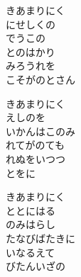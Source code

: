 \documentclass[10pt,b5j]{tarticle} %
\begin{document}
\vspace{1.5em} %
\newcommand{\linespace}{0.5em} %
\newcommand{\blocksize}{0.5\hsize} %
\begin{enumerate} %
    \begin{minipage}[c]{\blocksize}
    
        \vspace{\linespace}
        \item
        きあまりにく\\
        にせしくの\\
        でうこの\\
        とのはかり\\
        みろうれを\\
        こそがのとさん
        
        \vspace{\linespace}
        \item
        きあまりにく\\
        えしのを\\
        いかんはこのみ\\
        れてがのても\\
        れぬをいつつ\\
        とをに
        
        \vspace{\linespace}
        \item
        きあまりにく\\
        ととにはる\\
        のみはらし\\
        たなびばたきに\\
        いなるえて\\
        びたんいざの
    
    \end{minipage}
\end{enumerate} %
\end{document}
